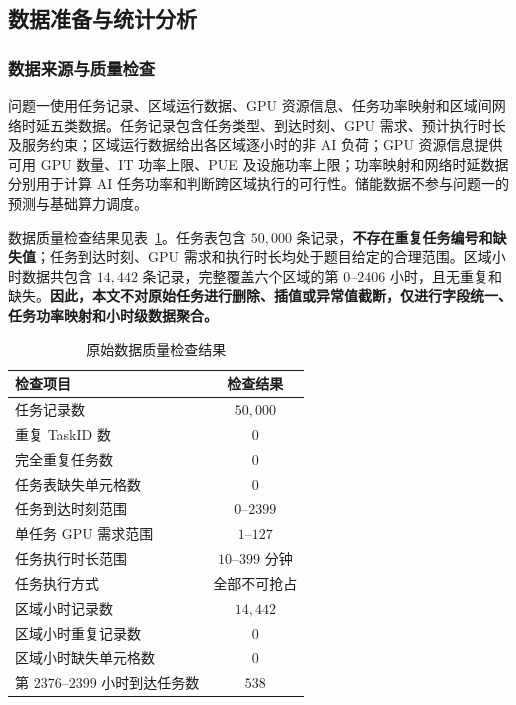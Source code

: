 \documentclass[UTF8,a4paper,zihao=-4]{ctexart}
\begin{document}
\subsection{数据准备与统计分析}
\label{sec:q1-data}

\subsubsection{数据来源与质量检查}

问题一使用任务记录、区域运行数据、GPU 资源信息、任务功率映射和区域间网络时延五类数据。任务记录包含任务类型、到达时刻、GPU 需求、预计执行时长及服务约束；区域运行数据给出各区域逐小时的非 AI 负荷；GPU 资源信息提供可用 GPU 数量、IT 功率上限、PUE 及设施功率上限；功率映射和网络时延数据分别用于计算 AI 任务功率和判断跨区域执行的可行性。储能数据不参与问题一的预测与基础算力调度。

数据质量检查结果见表~\ref{tab:data-audit}。任务表包含 $50{,}000$ 条记录，\textbf{不存在重复任务编号和缺失值}；任务到达时刻、GPU 需求和执行时长均处于题目给定的合理范围。区域小时数据共包含 $14{,}442$ 条记录，完整覆盖六个区域的第 $0$--$2406$ 小时，且无重复和缺失。\textbf{因此，本文不对原始任务进行删除、插值或异常值截断，仅进行字段统一、任务功率映射和小时级数据聚合。}

\begin{table}[htbp]
\centering
\footnotesize
\caption{原始数据质量检查结果}
\label{tab:data-audit}
\begin{tabular}{lc}
\toprule
检查项目 & 检查结果 \\
\midrule
任务记录数 & $50{,}000$ \\
重复 TaskID 数 & $0$ \\
完全重复任务数 & $0$ \\
任务表缺失单元格数 & $0$ \\
任务到达时刻范围 & $0$--$2399$ \\
单任务 GPU 需求范围 & $1$--$127$ \\
任务执行时长范围 & $10$--$399$ 分钟 \\
任务执行方式 & 全部不可抢占 \\
区域小时记录数 & $14{,}442$ \\
区域小时重复记录数 & $0$ \\
区域小时缺失单元格数 & $0$ \\
第 $2376$--$2399$ 小时到达任务数 & $538$ \\
\bottomrule
\end{tabular}
\end{table}
\end{document}
